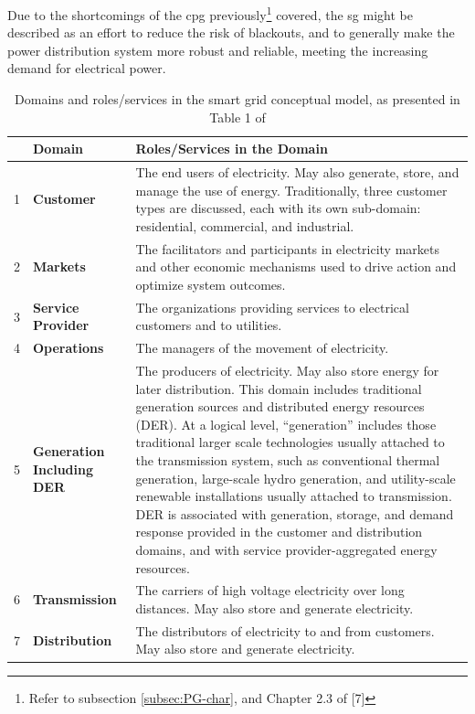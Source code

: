 Due to the shortcomings of the \acrshort{cpg} previously\footnote{Refer to subsection \ref{subsec:PG-char}, and Chapter 2.3 of [7]} covered, the \acrshort{sg} might be described as an effort to reduce the risk of blackouts, and to generally make the power distribution system more robust and reliable, meeting the increasing demand for electrical power.
 
\begin{table}[t]
    \centering
 
    \begin{tabular}{|p{0.3cm}|p{2.2cm}|p{9.1cm}|}
   \hline

 &\textbf{Domain} & \textbf{Roles/Services in the Domain} \\ \hline
 
1 & \textbf{Customer} & The end users of electricity. May also generate, store, and manage the use of energy. Traditionally, three customer types are discussed, each with its own sub-domain: residential, commercial, and industrial. \\ \hline
2 & \textbf{Markets} & The facilitators and participants in electricity markets and other economic mechanisms used to drive action and optimize system outcomes. \\ \hline
3 & \textbf{Service Provider} & The organizations providing services to electrical customers and to utilities. \\ \hline
4 & \textbf{Operations} & The managers of the movement of electricity. \\ \hline
5 & \textbf{Generation Including DER} & The producers of electricity. May also store energy for later distribution. This domain includes traditional generation sources and distributed energy resources (DER). At a logical level, “generation” includes those traditional larger scale technologies usually attached to the transmission system, such as conventional thermal generation, large-scale hydro generation, and utility-scale renewable installations usually attached to transmission. DER is associated with generation, storage, and demand response provided in the customer and distribution domains, and with service provider-aggregated energy resources. \\ \hline
6 & \textbf{Transmission} & The carriers of high voltage electricity over long distances. May also store and generate electricity. \\ \hline
7 & \textbf{Distribution} & The distributors of electricity to and from customers. May also store and generate electricity.\\
    \hline


    
    \end{tabular}

    \caption[Domains and roles/services in the smart grid conceptual model]{Domains and roles/services in the smart grid conceptual model, as presented in Table 1 of \cite{gopstein2021nist}}
    \label{tab:nist-domains}
\end{table}


